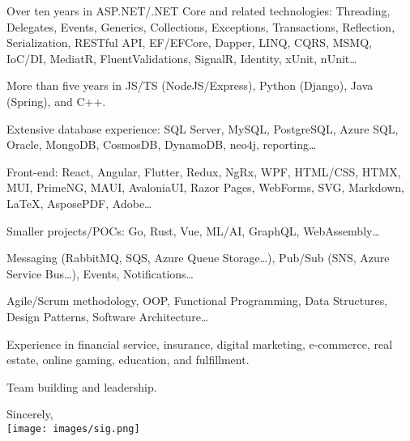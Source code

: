 \documentclass[]{deedy-cover-letter-openfont}
\begin{document}
\begin{tightitemize}
    \item Over ten years in ASP.NET/.NET Core and related technologies: Threading, Delegates, Events, Generics, Collections, Exceptions, Transactions, Reflection, Serialization, RESTful API, EF/EFCore, Dapper, LINQ, CQRS, MSMQ, IoC/DI, MediatR, FluentValidations, SignalR, Identity, xUnit, nUnit\ldots
    \item More than five years in JS/TS (NodeJS/Express), Python (Django), Java (Spring), and C++.
    \item Extensive database experience: SQL Server, MySQL, PostgreSQL, Azure SQL, Oracle, MongoDB, CosmosDB, DynamoDB, neo4j, reporting\ldots
    \item Front-end: React, Angular, Flutter, Redux, NgRx, WPF, HTML/CSS, HTMX, MUI, PrimeNG, MAUI, AvaloniaUI, Razor Pages, WebForms, SVG, Markdown, LaTeX, AsposePDF, Adobe\ldots
    \item Smaller projects/POCs: Go, Rust, Vue, ML/AI, GraphQL, WebAssembly\ldots
    \item Messaging (RabbitMQ, SQS, Azure Queue Storage\ldots), Pub/Sub (SNS, Azure Service Bus\ldots), Events, Notifications\ldots
    \item Agile/Scrum methodology, OOP, Functional Programming, Data Structures, Design Patterns, Software Architecture\ldots
    \item Experience in financial service, insurance, digital marketing, e-commerce, real estate, online gaming, education, and fulfillment.
    \item Team building and leadership.
\end{tightitemize}

\sectionspace%



\closing{Sincerely,\\ \texttt{[image: images/sig.png]} \vspace{-0.75cm} }

\signature{Sinisa Petkovic}
\end{document}
